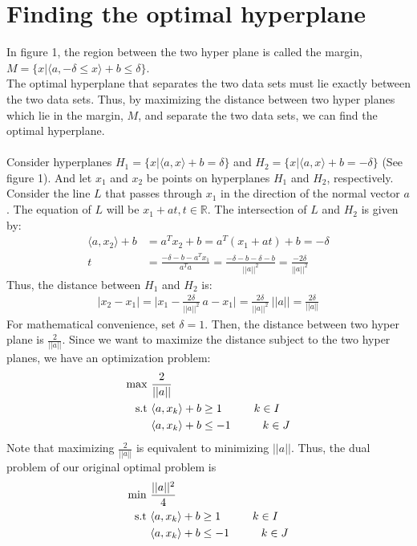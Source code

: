 \documentclass[11pt, a4paper]{article}
\begin{document}
\section{Finding the optimal hyperplane}
In figure 1, the region between the two hyper plane is called the margin, $M = \{x| \langle a, -\delta \le x\rangle + b \le \delta\}$. \\
The optimal hyperplane that separates the two data sets must lie exactly between the two data sets. Thus, by maximizing the distance between two hyper planes which lie in the margin, $M$, and separate the two data sets, we can find the optimal hyperplane.
\\ \\
Consider hyperplanes $H_1 = \{x| \langle a,x\rangle +b = \delta\}$ and $H_2 = \{x| \langle a,x\rangle +b = -\delta\}$ (See figure 1). And let $x_1$ and $x_2$ be  points on hyperplanes $H_1$ and $H_2$, respectively. Consider the line $L$ that passes through $x_1$ in the direction of the normal vector $a$. The equation of $L$ will be $x_1 + at, t\in\mathbb{R}$. The intersection of $L$ and $H_2$ is given by:
\begin{align*}
\langle a, x_2\rangle + b &= a^T x_2 +b = a^T (x_1+at) + b = - \delta\\
t &= \frac{-\delta - b - a^Tx_1}{a^Ta} = \frac{- \delta-b - \delta - b}{||a||^2} = \frac{- 2\delta}{||a||^2}
\end{align*}
Thus, the distance between $H_1$ and $H_2$ is:\begin{align*}
|x_2 - x_1| = \big|x_1 - \frac{2\delta}{||a||^2}\ a -x_1\big| = \frac{2\delta}{||a||^2}\ ||a|| = \frac{2\delta}{||a||}
\end{align*}
For mathematical convenience, set $\delta = 1$. Then, the distance between two hyper plane is $\frac{2}{||a||}$. Since we want to maximize the distance subject to the two hyper planes, we have an optimization problem:\begin{align*}
\max\ & \frac{2}{||a||}\\
\text{s.t}\ &\langle a, x_k  \rangle+ b \ge 1 \hspace*{1cm} k\in I \\
&\langle a, x_k  \rangle+ b \le - 1 \hspace*{1cm} k\in J
\end{align*}
Note that maximizing $\frac{2}{||a||}$ is equivalent to minimizing $||a||$. Thus, the dual problem of our original optimal problem is\begin{align*}
\min\ & \frac{||a||^2}{4}\\
\text{s.t}\ &\langle a, x_k  \rangle+ b \ge 1 \hspace*{1cm} k\in I \\
&\langle a, x_k  \rangle+ b \le - 1 \hspace*{1cm} k\in J
\end{align*}
\end{document}
